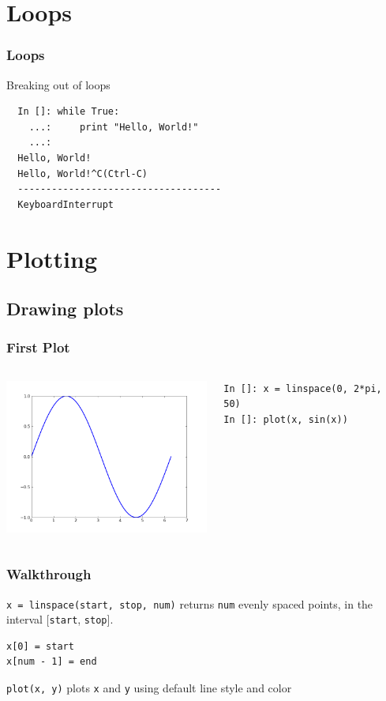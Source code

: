 \documentclass[14pt,compress]{beamer}
\newcounter{time}
\newcommand{\inctime}[1]{\addtocounter{time}{#1}{\tiny \thetime\ m}}
\newcommand{\typ}[1]{\lstinline{#1}}
\begin{document}
\section{Loops}
\begin{frame}[fragile]
\frametitle{Loops}
Breaking out of loops
\begin{lstlisting}     
  In []: while True:
    ...:     print "Hello, World!"
    ...:     
  Hello, World!
  Hello, World!^C(Ctrl-C)
  ------------------------------------
  KeyboardInterrupt                   
\end{lstlisting}
\end{frame}

\section{Plotting}
\subsection{Drawing plots}
\begin{frame}[fragile]
\frametitle{First Plot}
\begin{columns}
    \hspace*{-0.5in}
  \includegraphics[height=2in, interpolate=true]{data/firstplot}
    \begin{block}{}
    \begin{small}
\begin{lstlisting}
In []: x = linspace(0, 2*pi, 50)
In []: plot(x, sin(x))
\end{lstlisting}
    \end{small}
    \end{block}
\end{columns}
\end{frame}

\begin{frame}[fragile]
\frametitle{Walkthrough}
\begin{block}{\typ{x = linspace(start, stop, num)} }
returns \typ{num} evenly spaced points, in the interval [\typ{start}, \typ{stop}].
\end{block}
\begin{lstlisting}
x[0] = start
x[num - 1] = end
\end{lstlisting}
\vspace*{.35in}
\begin{block}{\typ{plot(x, y)}}
plots \typ{x} and \typ{y} using default line style and color
\end{block}
\end{frame}
\end{document}
